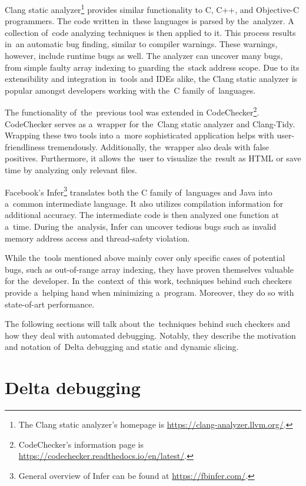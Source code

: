 Clang static analyzer\footnote{The Clang static analyzer's 
homepage is \url{https://clang-analyzer.llvm.org/}.} provides 
similar functionality to C, C++, and 
Ob\-jec\-tive-C programmers.
The code written in~these languages is parsed by the~ana\-ly\-zer.
A collection of~code analyzing techniques is then applied to it.
This process results in~an automatic bug finding, similar to compiler 
warnings.
These war\-nings, however, include runtime bugs as well.
The analyzer can uncover many bugs, from simple faulty array 
indexing to guarding the~stack address scope.
Due to its extensibility and integration in~tools and IDEs alike, 
the Clang static analyzer is popular amongst developers working 
with the~C family of~languages.

The functionality of~the~previous tool was extended 
in CodeChecker\footnote{CodeChecker's information
page is \url{https://codechecker.readthedocs.io/en/latest/}.}.
Code\-Check\-er serves as a~wrapper for the~Clang static analyzer and 
Clang-Tidy.
Wrapping these two tools into a~more sophisticated application helps 
with user-friend\-li\-ness tremendously.
Additionally, the~wrapper also deals with false positives.
Furthermore, it allows the~user to visualize the~result as HTML or 
save time by analyzing only relevant files.

Facebook's Infer\footnote{General overview of Infer can be found at 
\url{https://fbinfer.com/}.} translates both 
the C family of~languages and Java 
into a~common intermediate language.
It also utilizes compilation information for add\-itional accuracy.
The intermediate code is then analyzed one function at a~time.
During the~analysis, Infer can uncover tedious bugs such as invalid 
memory address access and thread-safety violation.

While the~tools mentioned above mainly cover only specific cases 
of potential bugs, such as out-of-range array indexing, they 
have proven themselves valuable for the~developer.
In the~context of~this work, techniques behind such checkers provide 
a~helping hand when minimizing a~program. 
Moreover, they do so with state-of-art performance.

The following sections will talk about the~techniques behind such checkers 
and how they deal with automated debugging. 
Notably, they describe the motivation and notation of~Delta debugging and 
static and dynamic slicing.

\section{Delta debugging}\label{chap:delta}

